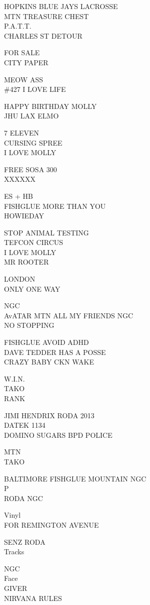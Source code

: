 \documentclass[10pt,letterpaper]{article}
\begin{document}
HOPKINS BLUE JAYS LACROSSE\\
MTN TREASURE CHEST\\
P.A.T.T.\\
CHARLES ST DETOUR

FOR SALE\\
CITY PAPER

MEOW ASS\\
\#427 I LOVE LIFE

HAPPY BIRTHDAY MOLLY\\
JHU LAX ELMO

7 ELEVEN\\
CURSING SPREE\\
I LOVE MOLLY

FREE SOSA 300\\
XXXXXX

ES  + HB\\
FISHGLUE MORE THAN YOU\\
HOWIEDAY

STOP ANIMAL TESTING\\
TEFCON CIRCUS\\
I LOVE MOLLY\\
MR ROOTER

LONDON\\
ONLY ONE WAY

NGC\\
AvATAR MTN ALL MY FRIENDS NGC\\
NO STOPPING

FISHGLUE AVOID ADHD\\
DAVE TEDDER HAS A POSSE\\
CRAZY BABY CKN WAKE

W.I.N.\\
TAKO\\
RANK

JIMI HENDRIX RODA 2013\\
DATEK 1134\\
DOMINO SUGARS BPD POLICE

MTN\\
TAKO

BALTIMORE FISHGLUE MOUNTAIN NGC\\
P\\
RODA NGC

Vinyl\\
FOR REMINGTON AVENUE

SENZ RODA\\
Tracks

NGC\\
Face\\
GIVER\\
NIRVANA RULES
\end{document}
